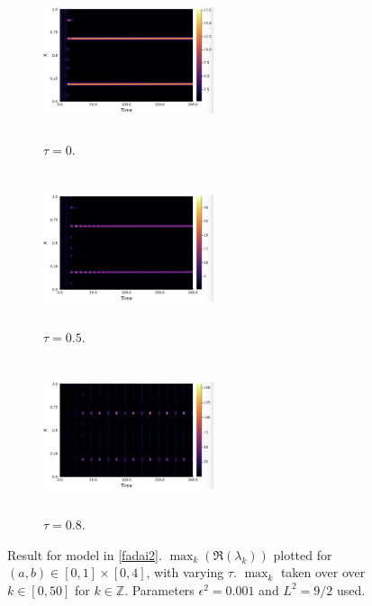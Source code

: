 \begin{figure}[H]
    \centering
    \begin{subfigure}[t]{0.32\textwidth}
        \centering
        \includegraphics[width=5cm,height = 4.5cm]{fad1t0.png}
        \caption{$\tau=0$.}
        \label{}
    \end{subfigure}
    \hfill
    \begin{subfigure}[t]{0.32\textwidth}
        \centering
        \includegraphics[width=5cm,height = 4.5cm]{fad1t02.png}
        \caption{$\tau=0.5$.}
        \label{}
    \end{subfigure}
    \hfill
    \begin{subfigure}[t]{0.32\textwidth}
        \centering
        \includegraphics[width=5cm,height = 4.5cm]{fad1t05.png}
        \caption{$\tau=0.8$.}
        \label{}
    \end{subfigure}
    \caption{Result for model in \eqref{fadai2}. $\max_k(\Re(\lambda_k))$ plotted for $(a,b)\in[0,1]\times[0,4]$, with varying $\tau$. $\max_k$ taken over over $k\in[0,50]$ for $k\in\mathbb{Z}$. Parameters $\epsilon^2=0.001$ and $L^2=9/2$ used.}
    \label{fig:fad2}
\end{figure}
